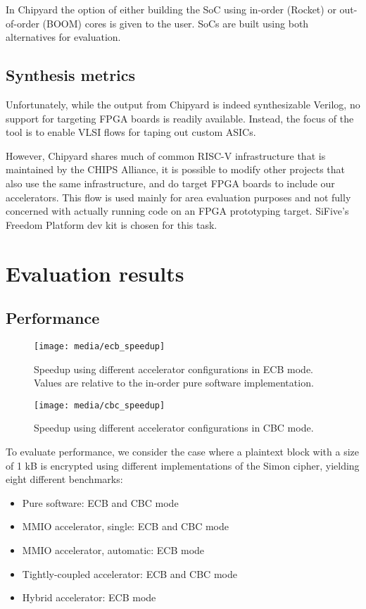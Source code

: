 \documentclass[10pt,conference]{IEEEtran}
\begin{document}
In Chipyard the option of either building the SoC using in-order (Rocket) or
out-of-order (BOOM) cores is given to the user. SoCs are built using both
alternatives for evaluation.

\subsection{Synthesis metrics}

Unfortunately, while the output from Chipyard is indeed synthesizable Verilog,
no support for targeting FPGA boards is readily available. Instead, the focus of
the tool is to enable VLSI flows for taping out custom ASICs.

However, Chipyard shares much of common RISC-V infrastructure that is maintained
by the CHIPS Alliance, it is possible to modify other projects that also use the
same infrastructure, and do target FPGA boards to include our accelerators. This
flow is used mainly for area evaluation purposes and not fully concerned with
actually running code on an FPGA prototyping target. SiFive's Freedom Platform
dev kit is chosen for this task.

\section{Evaluation results}

\subsection{Performance}

\begin{figure}
  \centering
  \texttt{[image: media/ecb\_speedup]}
  \caption{Speedup using different accelerator configurations in ECB mode.
    Values are relative to the in-order pure software implementation.}
  \label{fig:ecbspeedup}
\end{figure}

\begin{figure}
  \centering
  \texttt{[image: media/cbc\_speedup]}
  \caption{Speedup using different accelerator configurations in CBC mode.}
  \label{fig:cbcspeedup}
\end{figure}

To evaluate performance, we consider the case where a plaintext block with a size of
1 kB is encrypted using different implementations of the Simon cipher, yielding
eight different benchmarks:

\begin{itemize}
\item Pure software: ECB and CBC mode
\item MMIO accelerator, single: ECB and CBC mode
\item MMIO accelerator, automatic: ECB mode
\item Tightly-coupled accelerator: ECB and CBC mode
\item Hybrid accelerator: ECB mode
\end{itemize}
\end{document}
